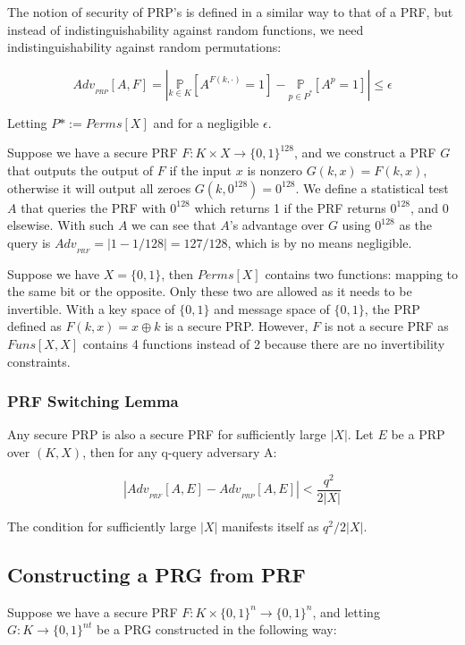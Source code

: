 \documentclass{article}
\begin{document}
\begin{multicols}{2}
The notion of security of PRP's is defined in a similar way to that of a PRF, but instead of indistinguishability against random functions, we need indistinguishability against random permutations:

$$
Adv_{_{PRP}}[A,F] = \left |\underset{k \in K}{\mathbb{P}}[A^{F(k, \cdot)} = 1] - \underset{p \in P^*}{\mathbb{P}}[A^{p} = 1] \right| \leq \epsilon
$$

Letting $P* := Perms[X]$ and for a negligible $\epsilon$.

Suppose we have a secure PRF $F: K \times X \rightarrow \{0,1\}^{128}$, and we construct a PRF $G$ that outputs the output of $F$ if the input $x$ is nonzero $G(k,x) = F(k,x)$, otherwise it will output all zeroes $G(k,0^{128}) = 0^{128}$. We define a statistical test $A$ that queries the PRF with $0^{128}$ which returns 1 if the PRF returns  $0^{128}$, and 0 elsewise. With such $A$ we can see that $A$'s advantage over $G$ using $0^{128}$ as the query is $Adv_{_{PRF}} = |1 - 1/128| = 127/128$, which is by no means negligible.

Suppose we have $X = \{0,1\}$, then $Perms[X]$ contains two functions: mapping to the same bit or the opposite. Only these two are allowed as it needs to  be invertible. With a key space of $\{0,1\}$ and message space of $\{0,1\}$, the PRP defined as $F(k,x) = x \oplus k$ is a secure PRP. However, $F$ is not a secure PRF as $Funs[X,X]$ contains 4 functions instead of 2 because there are no invertibility constraints.

\subsubsection{PRF Switching Lemma}

Any secure PRP is also a secure PRF for sufficiently large $|X|$. Let $E$ be a PRP over $(K,X)$, then for any q-query adversary A:

$$
\left| Adv_{_{PRF}}[A,E] - Adv_{_{PRP}}[A,E] \right| < \frac{q^2}{2|X|}
$$

The condition for sufficiently large $|X|$ manifests itself as $q^2/2|X|$.

\subsection{Constructing a PRG from PRF}

Suppose we have a secure PRF $F: K \times \{0,1\}^n \rightarrow \{0,1\}^n$, and letting $G: K \rightarrow \{0,1\}^{nt}$ be a PRG constructed in the following way:


\end{multicols}
\end{document}
